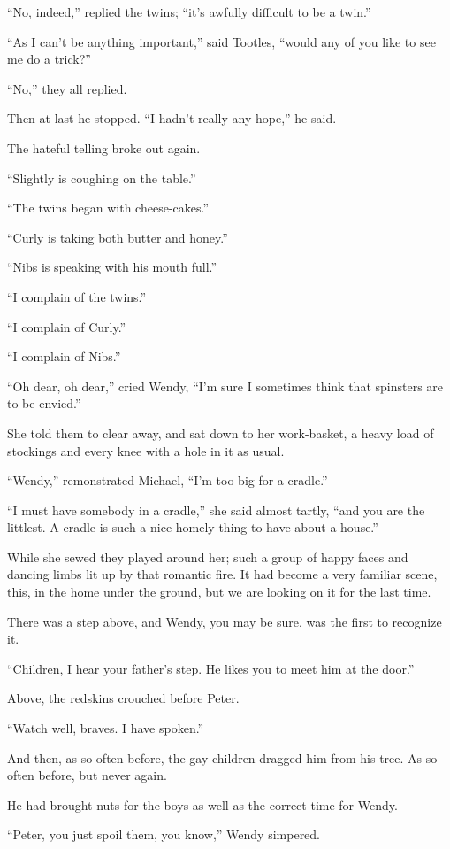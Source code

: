 “No, indeed,” replied the twins;
“it’s awfully difficult to be a twin.”

“As I can’t be anything important,” said Tootles,
“would any of you like to see me do a trick?”

“No,” they all replied.

Then at last he stopped.
“I hadn’t really any hope,” he said.

The hateful telling broke out again.

“Slightly is coughing on the table.”

“The twins began with cheese-cakes.”

“Curly is taking both butter and honey.”

“Nibs is speaking with his mouth full.”

“I complain of the twins.”

“I complain of Curly.”

“I complain of Nibs.”

“Oh dear, oh dear,” cried Wendy,
“I’m sure I sometimes think that spinsters are to be envied.”

She told them to clear away,
and sat down to her work-basket, a heavy load of stockings and every knee with a hole in it as usual.

“Wendy,” remonstrated Michael, “I’m too big for a cradle.”

“I must have somebody in a cradle,” she said almost tartly,
“and you are the littlest.
A cradle is such a nice homely thing to have about a house.”

While she sewed they played around her;
such a group of happy faces and dancing limbs lit up by that romantic fire.
It had become a very familiar scene, this, in the home under the ground,
but we are looking on it for the last time.

There was a step above, and Wendy, you may be sure, was the first to recognize it.

“Children, I hear your father’s step.
He likes you to meet him at the door.”

Above, the redskins crouched before Peter.

“Watch well, braves.
I have spoken.”

And then, as so often before, the gay children dragged him from his tree.
As so often before, but never again.

He had brought nuts for the boys as well as the correct time for Wendy.

“Peter, you just spoil them, you know,” Wendy simpered.

